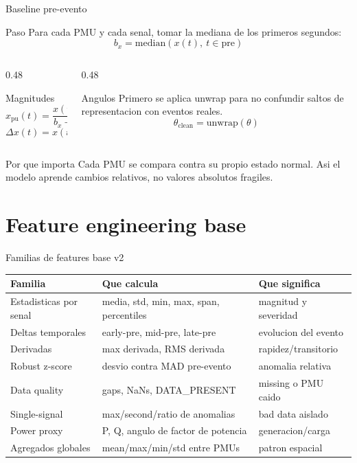 \documentclass[10pt,aspectratio=169]{beamer}
\begin{document}
\begin{frame}{Baseline pre-evento}
\small
\begin{block}{Paso}
Para cada PMU y cada senal, tomar la mediana de los primeros segundos:
\[
  b_x = \mathrm{median}\left(x(t),\ t \in \mathrm{pre}\right)
\]
\end{block}
\begin{columns}[T,totalwidth=\textwidth]
\begin{column}{0.48\textwidth}
\begin{exampleblock}{Magnitudes}
\[
  x_{\mathrm{pu}}(t) = \frac{x(t)}{b_x + \epsilon}
\]
\[
  \Delta x(t) = x(t) - b_x
\]
\end{exampleblock}
\end{column}
\begin{column}{0.48\textwidth}
\begin{alertblock}{Angulos}
Primero se aplica unwrap para no confundir saltos de representacion con eventos reales.
\[
  \theta_{\mathrm{clean}} = \mathrm{unwrap}(\theta)
\]
\end{alertblock}
\end{column}
\end{columns}
\vspace{1mm}
\begin{block}{Por que importa}
Cada PMU se compara contra su propio estado normal. Asi el modelo aprende cambios relativos, no valores absolutos fragiles.
\end{block}
\end{frame}

\section{Feature engineering base}

\begin{frame}{Familias de features base v2}
\small
\centering
\begin{tabular}{p{}p{}p{}}
\toprule
\textbf{Familia} & \textbf{Que calcula} & \textbf{Que significa}\\
\midrule
Estadisticas por senal & media, std, min, max, span, percentiles & magnitud y severidad\\
Deltas temporales & early-pre, mid-pre, late-pre & evolucion del evento\\
Derivadas & max derivada, RMS derivada & rapidez/transitorio\\
Robust z-score & desvio contra MAD pre-evento & anomalia relativa\\
Data quality & gaps, NaNs, DATA\_PRESENT & missing o PMU caido\\
Single-signal & max/second/ratio de anomalias & bad data aislado\\
Power proxy & P, Q, angulo de factor de potencia & generacion/carga\\
Agregados globales & mean/max/min/std entre PMUs & patron espacial\\
\bottomrule
\end{tabular}
\end{frame}
\end{document}
